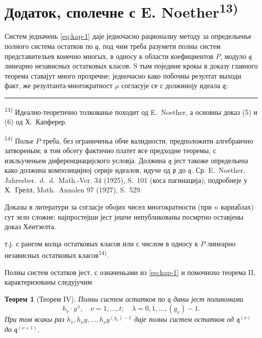 \documentclass[11pt]{article}
\newcommand{\foreign}[1]{#1}
\theoremstyle{plain}
\newtheorem{satz}{Теорем}
\begin{document}
\newpage
\section*{Додаток, сполечне с E. Noether\textsuperscript{13)}}

Систем једначень \eqref{eq:kap-1} даје једночасно рационалну
методу за определьенье полного система остатков по $\mathfrak{q}$,
под чим треба разумети полны систем представительев конечно многых,
в односу к области коефициентов $P$, модуло $\mathfrak{q}$ линеарно
независных остатковых класов. S тым поједине крокы в доказу
главного теорема ставајут много прозречне; једночасно како
побочны резултат выходи факт, же резултанта-многократност $\mu$
согласује се с должиноју идеала $\mathfrak{q}$;

\vspace{0.5em}
\noindent\rule{\textwidth}{0.4pt}
\vspace{0.3em}

{\footnotesize
\textsuperscript{13)} Идеално-теоретично толкованье походит од E.\ Noether, а основны
доказ (5) и (6) од Х.\ Капферер.

\textsuperscript{14)} Полье $P$ треба, без ограниченьа обче валидности, предположити
алгебраично затвореным; в том обсегу фактично платет все предходне
теоремы, с изкльученьем диференциацијского условја. Должина
$\mathfrak{q}$ јест такоже определьена како должина композицијној
серије идеалов, идуче од $\mathfrak{p}$ до $\mathfrak{q}$. Ср.
E.\ Noether, \foreign{Jahresber.\ d.\ d.\ Math.-Ver.} 34 (1925), S.~101
(коса пагинација); подробнеје у Х.\ Грелл, \foreign{Math.\ Annalen} 97
(1927), S.~529.

Доказы в литератури за согласје обојих чисел многократности (при
$n$ вариаблах) сут зело сложне; најпростејши јест јешче непубликованы
посмртно оставјены доказ Хентзелта.
}

\vspace{1em}
т.ј. с рангом колца остатковых класов или с числом в односу к $P$
линеарно независных остатковых класов\textsuperscript{14)}.

Полны систем остатков јест, с означеньами из \eqref{eq:kap-1} и
помочнохо теорема II, карактеризованы следујучим

\begin{satz}[Теорем IV]\label{satz:kap-IV}
Полны систем остатков по $\mathfrak{q}$ даны јест полиномами
\[
h_{\nu} \cdot y^{\lambda}, \quad \nu = 1, \ldots, t; \quad \lambda = 0, 1, \ldots, (g_{\nu})-1.
\]
При том всакы раз
$h_{\nu}, h_{\nu}y, \ldots, h_{\nu}y^{(g_{\nu})-1}$ даје полны
систем остатков од $\mathfrak{q}^{(\nu)}$ до
$\mathfrak{q}^{(\nu+1)}$.
\end{satz}
\end{document}
